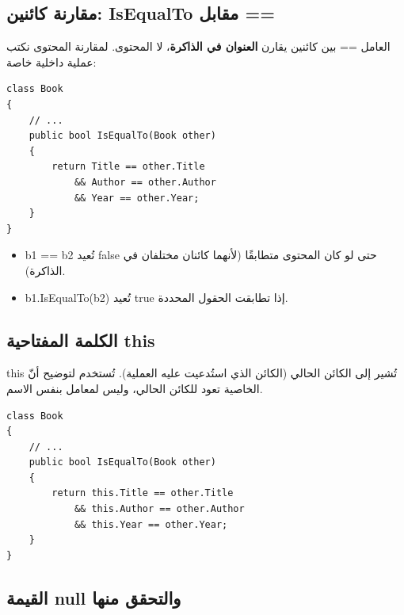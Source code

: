 \documentclass[14pt]{extarticle}
\begin{document}
\subsection{مقارنة كائنين: \textenglish{IsEqualTo} مقابل \textenglish{==}}

العامل \textenglish{==} بين كائنين يقارن \textbf{العنوان في الذاكرة}، لا المحتوى.
لمقارنة المحتوى نكتب عملية داخلية خاصة:

\begin{boxExample}
\begin{english}
\begin{verbatim}
class Book
{
    // ...
    public bool IsEqualTo(Book other)
    {
        return Title == other.Title
            && Author == other.Author
            && Year == other.Year;
    }
}
\end{verbatim}
\end{english}
\end{boxExample}

\begin{itemize}[itemsep=1pt]
    \item \textenglish{b1 == b2} تُعيد \textenglish{false} حتى لو كان المحتوى متطابقًا (لأنهما كائنان مختلفان في الذاكرة).
    \item \textenglish{b1.IsEqualTo(b2)} تُعيد \textenglish{true} إذا تطابقت الحقول المحددة.
\end{itemize}

\subsection{الكلمة المفتاحية \textenglish{this}}

\textenglish{this} تُشير إلى الكائن الحالي (الكائن الذي استُدعيت عليه العملية). تُستخدم لتوضيح أنّ الخاصية تعود للكائن الحالي، وليس لمعامل بنفس الاسم.

\begin{boxExample}
\begin{english}
\begin{verbatim}
class Book
{
    // ...
    public bool IsEqualTo(Book other)
    {
        return this.Title == other.Title
            && this.Author == other.Author
            && this.Year == other.Year;
    }
}
\end{verbatim}
\end{english}
\end{boxExample}

\subsection{القيمة \textenglish{null} والتحقق منها}
\end{document}
